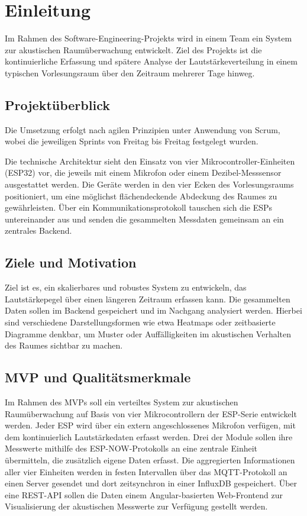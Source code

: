 \chapter{Einleitung}
\label{cha:einleitung}

Im Rahmen des Software-Engineering-Projekts wird in einem Team ein System zur akustischen Raumüberwachung entwickelt. 
Ziel des Projekts ist die kontinuierliche Erfassung und spätere Analyse der Lautstärkeverteilung in einem typischen Vorlesungsraum über den Zeitraum mehrerer Tage hinweg.

\section{Projektüberblick}

Die Umsetzung erfolgt nach agilen Prinzipien unter Anwendung von Scrum, wobei die jeweiligen Sprints von Freitag bis Freitag festgelegt wurden. 

Die technische Architektur sieht den Einsatz von vier Mikrocontroller-Einheiten (ESP32) vor, die jeweils mit einem Mikrofon oder einem Dezibel-Messsensor ausgestattet werden. 
Die Geräte werden in den vier Ecken des Vorlesungsraums positioniert, um eine möglichst flächendeckende Abdeckung des Raumes zu gewährleisten. Über ein Kommunikationsprotokoll tauschen sich die ESPs untereinander aus und 
senden die gesammelten Messdaten gemeinsam an ein zentrales Backend.

\section{Ziele und Motivation}

Ziel ist es, ein skalierbares und robustes System zu entwickeln, das Lautstärkepegel über einen längeren Zeitraum erfassen kann. Die gesammelten Daten sollen im Backend gespeichert und im Nachgang analysiert werden. 
Hierbei sind verschiedene Darstellungsformen wie etwa Heatmaps oder zeitbasierte Diagramme denkbar, um Muster oder Auffälligkeiten im akustischen Verhalten des Raumes sichtbar zu machen.

\section{MVP und Qualitätsmerkmale}

Im Rahmen des MVPs soll ein verteiltes System zur akustischen Raumüberwachung auf Basis von vier Mikrocontrollern der ESP-Serie entwickelt werden. 
Jeder ESP wird über ein extern angeschlossenes Mikrofon verfügen, mit dem kontinuierlich Lautstärkedaten erfasst werden. Drei der Module sollen ihre Messwerte mithilfe des ESP-NOW-Protokolls an eine zentrale Einheit übermitteln, 
die zusätzlich eigene Daten erfasst. Die aggregierten Informationen aller vier Einheiten werden in festen Intervallen über das MQTT-Protokoll an einen Server gesendet und dort zeitsynchron in einer InfluxDB gespeichert. 
Über eine REST-API sollen die Daten einem Angular-basierten Web-Frontend zur Visualisierung der akustischen Messwerte zur Verfügung gestellt werden.


